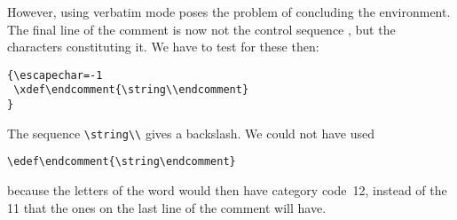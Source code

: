 However, using verbatim mode poses the problem of concluding the 
environment.
\altt
The final line of the comment is now not the control sequence
, but the characters constituting it. We have
to test for these then:
\begin{verbatim}
{\escapechar=-1
 \xdef\endcomment{\string\\endcomment}
}
\end{verbatim}
The sequence \verb>\string\\> gives a backslash.
We could not have used
\begin{verbatim}
\edef\endcomment{\string\endcomment}
\end{verbatim}
because
the letters of the word  would then have
category code~12, instead of the 11 that the ones on the
last line of the comment will have.

\endofchapter
